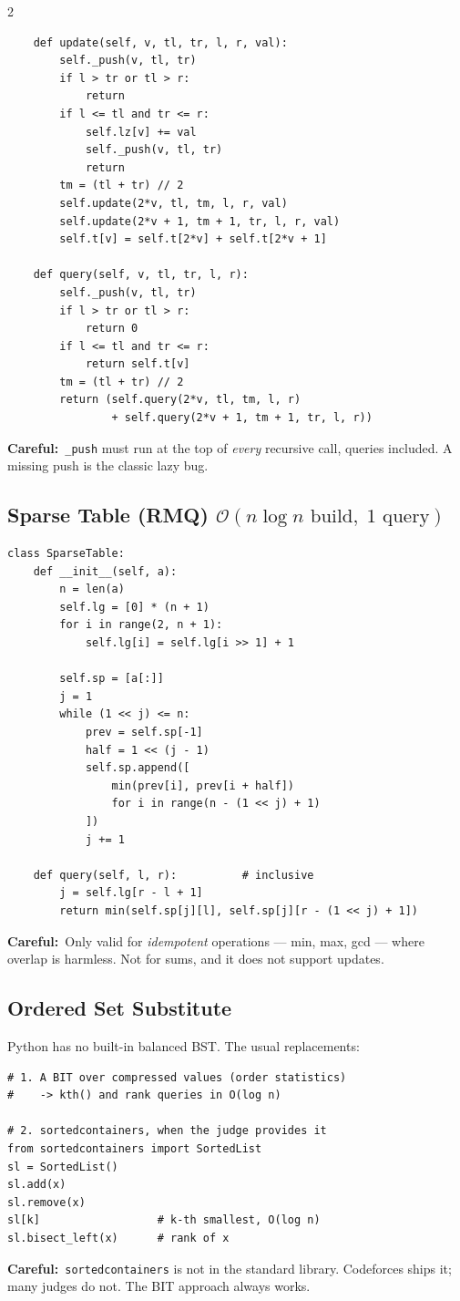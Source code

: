 \documentclass[10pt]{article}
\newcommand{\code}[1]{\texttt{\small #1}}
\newcommand{\sub}[2]{\subsection[#1]{#1\hspace{0.6em}%
  \textnormal{\color{accent2}\small$\mathcal{O}(#2)$}}}
\newcommand{\warn}[1]{{\color{warnc}\footnotesize\textbf{Careful:}}~{\footnotesize #1}\par}
\begin{document}
\begin{multicols}{2}
\begin{lstlisting}
    def update(self, v, tl, tr, l, r, val):
        self._push(v, tl, tr)
        if l > tr or tl > r:
            return
        if l <= tl and tr <= r:
            self.lz[v] += val
            self._push(v, tl, tr)
            return
        tm = (tl + tr) // 2
        self.update(2*v, tl, tm, l, r, val)
        self.update(2*v + 1, tm + 1, tr, l, r, val)
        self.t[v] = self.t[2*v] + self.t[2*v + 1]

    def query(self, v, tl, tr, l, r):
        self._push(v, tl, tr)
        if l > tr or tl > r:
            return 0
        if l <= tl and tr <= r:
            return self.t[v]
        tm = (tl + tr) // 2
        return (self.query(2*v, tl, tm, l, r)
                + self.query(2*v + 1, tm + 1, tr, l, r))
\end{lstlisting}
\warn{\code{\_push} must run at the top of \emph{every} recursive call,
queries included. A missing push is the classic lazy bug.}

\sub{Sparse Table (RMQ)}{n \log n \text{ build},\; 1 \text{ query}}
\begin{lstlisting}
class SparseTable:
    def __init__(self, a):
        n = len(a)
        self.lg = [0] * (n + 1)
        for i in range(2, n + 1):
            self.lg[i] = self.lg[i >> 1] + 1

        self.sp = [a[:]]
        j = 1
        while (1 << j) <= n:
            prev = self.sp[-1]
            half = 1 << (j - 1)
            self.sp.append([
                min(prev[i], prev[i + half])
                for i in range(n - (1 << j) + 1)
            ])
            j += 1

    def query(self, l, r):          # inclusive
        j = self.lg[r - l + 1]
        return min(self.sp[j][l], self.sp[j][r - (1 << j) + 1])
\end{lstlisting}
\warn{Only valid for \emph{idempotent} operations --- min, max, gcd ---
where overlap is harmless. Not for sums, and it does not support
updates.}

\subsection{Ordered Set Substitute}
Python has no built-in balanced BST. The usual replacements:
\begin{lstlisting}
# 1. A BIT over compressed values (order statistics)
#    -> kth() and rank queries in O(log n)

# 2. sortedcontainers, when the judge provides it
from sortedcontainers import SortedList
sl = SortedList()
sl.add(x)
sl.remove(x)
sl[k]                  # k-th smallest, O(log n)
sl.bisect_left(x)      # rank of x
\end{lstlisting}
\warn{\code{sortedcontainers} is not in the standard library. Codeforces
ships it; many judges do not. The BIT approach always works.}


\end{multicols}
\end{document}
